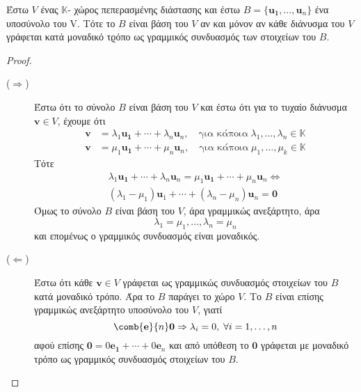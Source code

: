 \begin{thm}
\item {}
  Έστω $V$ ένας $ \mathbb{K} $- χώρος πεπερασμένης διάστασης και έστω 
  $ B = \{ \mathbf{u_{1}}, \ldots, \mathbf{u}_{n} \} $ ένα υποσύνολο του V. Τότε 
  το $B$ είναι βάση του $V$ αν και μόνον αν κάθε διάνυσμα του $V$ γράφεται 
  κατά μοναδικό τϱόπο ως γραμμικός συνδυασμός των στοιχείων του $B$.
\end{thm}
\begin{proof}
\item {}
  \begin{description}
    \item [($ \Rightarrow $)]
      Έστω ότι το σύνολο $B$ είναι βάση του $V$ και έστω ότι για το 
      τυχαίο διάνυσμα $ \mathbf{v} \in V $, έχουμε ότι 
      \begin{align*} 
    \mathbf{v} &= \lambda _{1} \mathbf{u_{1}}+ \cdots + \lambda _{n} 
    \mathbf{u}_{n}, \quad \text{για κάποια} \;  \lambda _{1}, \ldots, 
    \lambda _{n} \in \mathbb{K}  \\
    \mathbf{v} &= \mu_{1} \mathbf{u_{1}}+ \cdots + \mu _{n} 
    \mathbf{u}_{n}, \quad \text{για κάποια} \;  \mu _{1}, \ldots, 
    \mu _{k} \in \mathbb{K}
  \end{align*}
  Τότε 
  \begin{gather*}
    \lambda _{1} \mathbf{u_{1}}+ \cdots + \lambda _{n} \mathbf{u}_{n} = 
    \mu_{1} \mathbf{u_{1}}+ \cdots + \mu _{n} \mathbf{u}_{n} 
    \Leftrightarrow \\
    (\lambda _{1}- \mu _{1}) \mathbf{u}_{1} + \cdots + (\lambda _{n} - 
    \mu _{n}) \mathbf{u}_{n} = \mathbf{0}
  \end{gather*}
  Όμως το σύνολο $B$ είναι βάση του $V$, άρα γραμμικώς ανεξάρτητο, άρα 
  \[
    \lambda _{1} = \mu _{1}, \ldots, \lambda _{n} = \mu _{n} 
  \] 
  και επομένως ο γραμμικός συνδυασμός είναι μοναδικός.
\item [($ \Leftarrow $)] 
  Έστω ότι κάθε $ \mathbf{v} \in V $ γράφεται ως γραμμικώς συνδυασμός 
  στοιχείων του $B$ κατά μοναδικό τρόπο. Άρα το $B$ παράγει το χώρο $V$. 
  Το $B$ είναι επίσης γραμμικώς ανεξάρτητο υποσύνολο του $V$, γιατί 
  \[
    \comb{\mathbf{e}}{n} \mathbf{0} \Rightarrow \lambda _{i} = 0, \; 
    \forall i=1,\ldots, n
  \] 
  αφού επίσης $ \mathbf{0} = 0 \mathbf{e_{1}}+\cdots + 0 \mathbf{e}_{n} $ 
  και από υπόθεση το $ \mathbf{0} $ γράφεται με μοναδικό τρόπο ως γραμμικός 
  συνδυασμός στοιχείων του $B$.
    \end{description} 
\end{proof}

